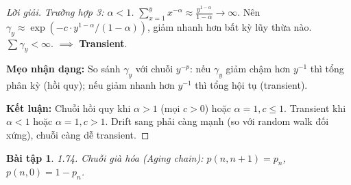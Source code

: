 \documentclass[8pt,a4paper]{article}
\newtheorem{exercise}{Bài tập}
\newenvironment{solution}{\begin{proof}[Lời giải]}{\end{proof}}
\begin{document}
\begin{solution}
\textit{Trường hợp 3: $\alpha < 1$.} $\sum_{x=1}^{y} x^{-\alpha} \approx \frac{y^{1-\alpha}}{1-\alpha} \to \infty$. Nên $\gamma_y \approx \exp(-c \cdot y^{1-\alpha}/(1-\alpha))$, giảm nhanh hơn bất kỳ lũy thừa nào. $\sum \gamma_y < \infty$. $\implies$ \textbf{Transient}.

\textbf{Mẹo nhận dạng:} So sánh $\gamma_y$ với chuỗi $y^{-p}$: nếu $\gamma_y$ giảm chậm hơn $y^{-1}$ thì tổng phân kỳ (hồi quy); nếu giảm nhanh hơn $y^{-1}$ thì tổng hội tụ (transient).

\textbf{Kết luận:} Chuỗi hồi quy khi $\alpha > 1$ (mọi $c > 0$) hoặc $\alpha = 1, c \leq 1$. Transient khi $\alpha < 1$ hoặc $\alpha = 1, c > 1$. Drift sang phải càng mạnh (so với random walk đối xứng), chuỗi càng dễ transient.
\end{solution}

\begin{exercise}
1.74. Chuỗi già hóa (Aging chain): $p(n, n+1) = p_n$, $p(n, 0) = 1-p_n$.
\end{exercise}
\end{document}
